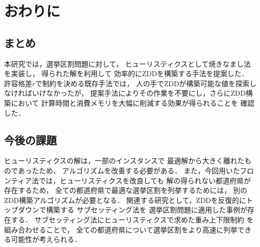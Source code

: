 \chapter{おわりに} \label{chapter:6}
\section{まとめ}
本研究では，選挙区割問題に対して，
ヒューリスティクスとして焼きなまし法を実装し，
得られた解を利用して
効率的にZDDを構築する手法を提案した．
許容格差$r$で制約を決める既存手法では，
人の手でZDDが構築可能な値を探索しなければいけなかったが，
提案手法によりその作業を不要にし，さらにZDD構築において
計算時間と消費メモリを大幅に削減する効果が得られることを
確認した．

\section{今後の課題}
ヒューリスティクスの解は，一部のインスタンスで
最適解から大きく離れたものであったため，
アルゴリズムを改善する必要がある．
また，今回用いたフロンティア法では，ヒューリスティクスを改良しても
解の得られない都道府県が存在するため，
全ての都道府県で最適な選挙区割を列挙するためには，
別のZDD構築アルゴリズムが必要となる．
関連する研究として，ZDDを反復的にトップダウンで構築する
サブセッティング法\cite{iwashita}を
選挙区割問題に適用した事例\cite{yamazaki}が存在する．
サブセッティング法にヒューリスティクスで求めた重み上下限制約
を組み合わせることで，
全ての都道府県について選挙区割をより高速に列挙できる可能性が考えられる．
